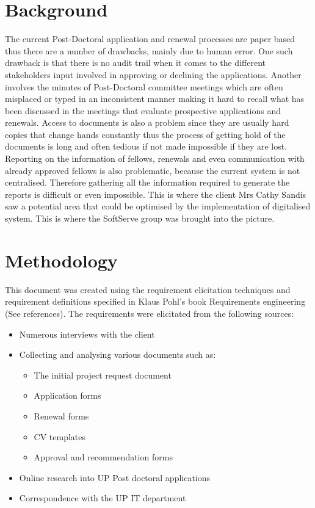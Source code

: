 \documentclass[12pt]{article}
\begin{document}
	\section{Background} %
	\vspace{0.2in}
	The current Post-Doctoral application and renewal processes are paper based thus there are a number of drawbacks, mainly due to human error. One such drawback is that there is no audit trail when it comes to the different stakeholders input involved in approving or declining the applications. Another involves the minutes of Post-Doctoral committee meetings which are often misplaced or typed in an inconsistent manner making it hard to recall what has been discussed in the meetings that evaluate prospective applications and renewals. Access to documents is also a problem since they are usually hard copies that change hands constantly thus the process of getting hold of the documents is long and often tedious if not made impossible if they are lost. Reporting on the information of fellows, renewals and even communication with already approved fellows is also problematic, because the current system is not centralised. Therefore gathering all the information required to generate the reports is difficult or even impossible. This is where the client Mrs Cathy Sandis saw a potential area that could be optimised by the implementation of digitalised system. This is where the SoftServe group was brought into the picture. 
	\vspace{0.5in}
	
	\newpage
	\section{Methodology} %
	\vspace{0.2in}
	
	This document was created using the requirement elicitation techniques and requirement definitions specified in Klaus Pohl’s book Requirements engineering (See references).
	The requirements were elicitated from the following sources:
	\begin{itemize}
		\item Numerous interviews with the client
		\item Collecting and analysing various documents such as:
		\begin{itemize}
			\item The initial project request document
			\item Application forms
			\item Renewal forms
			\item CV templates
			\item Approval and recommendation forms			 
		\end{itemize}		
		\item Online research into UP Post doctoral applications
		\item Correspondence with the UP IT department
	\end{itemize}	
	
\end{document}
